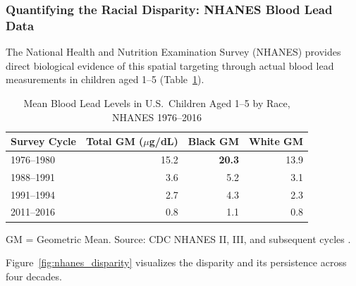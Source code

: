 \documentclass[12pt, letterpaper]{article}
\begin{document}
\subsubsection{Quantifying the Racial Disparity: NHANES Blood Lead Data}

The National Health and Nutrition Examination Survey (NHANES) provides direct biological evidence of this spatial targeting through actual blood lead measurements in children aged 1--5 (Table~\ref{tab:nhanes_bll}).

\begin{table}[H]
\centering
\caption{Mean Blood Lead Levels in U.S.\ Children Aged 1--5 by Race, NHANES 1976--2016}
\label{tab:nhanes_bll}
\begin{tabular}{lrrr}
\toprule
\textbf{Survey Cycle} & \textbf{Total GM ($\mu$g/dL)} & \textbf{Black GM} & \textbf{White GM} \\
\midrule
1976--1980 & 15.2 & \textbf{20.3} & 13.9 \\
1988--1991 & 3.6 & 5.2 & 3.1 \\
1991--1994 & 2.7 & 4.3 & 2.3 \\
2011--2016 & 0.8 & 1.1 & 0.8 \\
\bottomrule
\end{tabular}
\vspace{0.5em}

\noindent\footnotesize{GM = Geometric Mean. Source: CDC NHANES II, III, and subsequent cycles \citep{nhanes_bll}.}
\end{table}

Figure~\ref{fig:nhanes_disparity} visualizes the disparity and its persistence across four decades.
\end{document}

